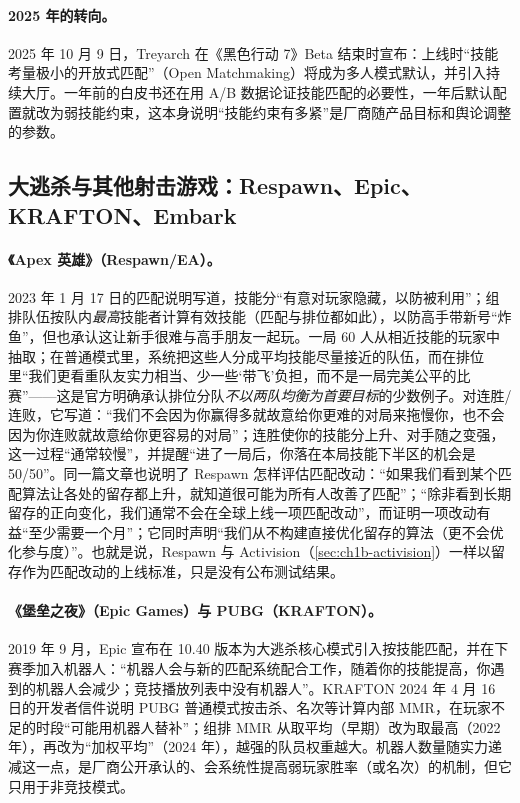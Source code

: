 \paragraph{2025 年的转向。}
2025 年 10 月 9 日，Treyarch 在《黑色行动 7》Beta 结束时宣布：上线时“技能考量极小的开放式匹配”（Open Matchmaking）将成为多人模式默认，并引入持续大厅\cite{treyarch2025bo7}\tagOff。一年前的白皮书还在用 A/B 数据论证技能匹配的必要性，一年后默认配置就改为弱技能约束，这本身说明“技能约束有多紧”是厂商随产品目标和舆论调整的参数。

\subsection{大逃杀与其他射击游戏：Respawn、Epic、KRAFTON、\mbox{Embark}}
\label{sec:ch1b-br}

\paragraph{《Apex 英雄》（Respawn/EA）。}
2023 年 1 月 17 日的匹配说明\cite{respawn2023matchmaking}写道，技能分“有意对玩家隐藏，以防被利用”；组排队伍按队内\emph{最高}技能者计算有效技能（匹配与排位都如此），以防高手带新号“炸鱼”，但也承认这让新手很难与高手朋友一起玩\tagOff。一局 60 人从相近技能的玩家中抽取；在普通模式里，系统把这些人分成平均技能尽量接近的队伍，而在排位里“我们更看重队友实力相当、少一些‘带飞’负担，而不是一局完美公平的比赛”\tagOff——这是官方明确承认排位分队\emph{不以两队均衡为首要目标}的少数例子。对连胜/连败，它写道：“我们不会因为你赢得多就故意给你更难的对局来拖慢你，也不会因为你连败就故意给你更容易的对局”；连胜使你的技能分上升、对手随之变强，这一过程“通常较慢”，并提醒“进了一局后，你落在本局技能下半区的机会是 50/50”\tagOff。同一篇文章也说明了 Respawn 怎样评估匹配改动：“如果我们看到某个匹配算法让各处的留存都上升，就知道很可能为所有人改善了匹配”；“除非看到长期留存的正向变化，我们通常不会在全球上线一项匹配改动”，而证明一项改动有益“至少需要一个月”；它同时声明“我们从不构建直接优化留存的算法（更不会优化参与度）”\tagOff。也就是说，Respawn 与 Activision（\cref{sec:ch1b-activision}）一样以留存作为匹配改动的上线标准，只是没有公布测试结果。

\paragraph{《堡垒之夜》（Epic Games）与 PUBG（KRAFTON）。}
2019 年 9 月，Epic 宣布在 10.40 版本为大逃杀核心模式引入按技能匹配，并在下赛季加入机器人：“机器人会与新的匹配系统配合工作，随着你的技能提高，你遇到的机器人会减少；竞技播放列表中没有机器人”\cite{pcgamer2019fortnite}\tagOff{}。KRAFTON 2024 年 4 月 16 日的开发者信件说明 PUBG 普通模式按击杀、名次等计算内部 MMR，在玩家不足的时段“可能用机器人替补”\cite{krafton2024pubg}\tagOff；组排 MMR 从取平均（早期）改为取最高（2022 年），再改为“加权平均”（2024 年），越强的队员权重越大\tagOff。机器人数量随实力递减这一点，是厂商公开承认的、会系统性提高弱玩家胜率（或名次）的机制，但它只用于非竞技模式。

